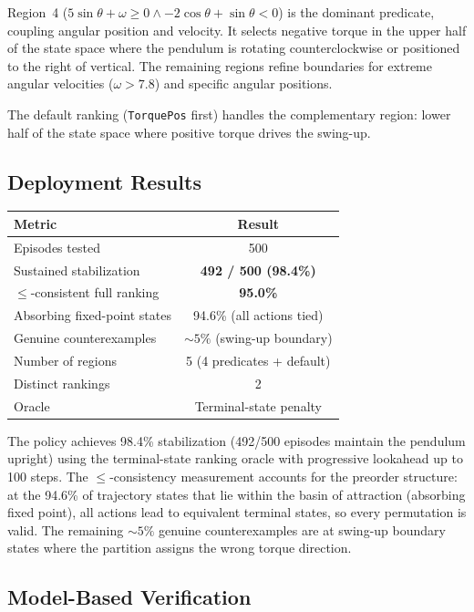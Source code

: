 \documentclass[9pt,a4paper]{article}
\theoremstyle{plain}
\theoremstyle{definition}
\theoremstyle{remark}
\begin{document}
Region~4 ($5 \sin\theta + \omega \ge 0 \wedge -2\cos\theta +
\sin\theta < 0$) is the dominant predicate, coupling angular
position and velocity. It selects negative torque in the upper
half of the state space where the pendulum is rotating
counterclockwise or positioned to the right of vertical. The
remaining regions refine boundaries for extreme angular velocities
($\omega > 7.8$) and specific angular positions.

The default ranking (\texttt{TorquePos} first) handles the
complementary region: lower half of the state space where positive
torque drives the swing-up.

\subsection{Deployment Results}

\begin{center}
\begin{tabular}{lc}
\toprule
\textbf{Metric} & \textbf{Result} \\
\midrule
Episodes tested & 500 \\
Sustained stabilization & \textbf{492 / 500 (98.4\%)} \\
$\le$-consistent full ranking & \textbf{95.0\%} \\
Absorbing fixed-point states & 94.6\% (all actions tied) \\
Genuine counterexamples & ${\sim}5\%$ (swing-up boundary) \\
Number of regions & 5 (4 predicates + default) \\
Distinct rankings & 2 \\
Oracle & Terminal-state penalty \\
\bottomrule
\end{tabular}
\end{center}

The policy achieves 98.4\% stabilization (492/500 episodes maintain
the pendulum upright) using the terminal-state ranking oracle with
progressive lookahead up to 100 steps. The $\le$-consistency
measurement accounts for the preorder structure: at the 94.6\% of
trajectory states that lie within the basin of attraction (absorbing
fixed point), all actions lead to equivalent terminal states, so
every permutation is valid. The remaining ${\sim}5\%$ genuine
counterexamples are at swing-up boundary states where the partition
assigns the wrong torque direction.

\subsection{Model-Based Verification}
\end{document}
